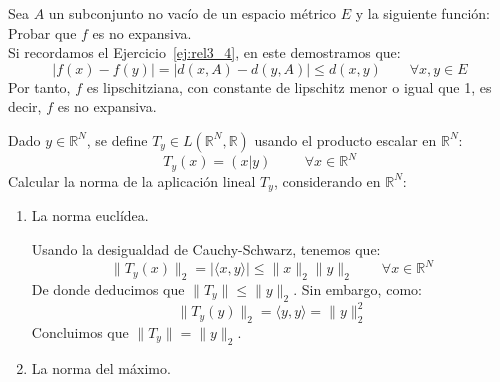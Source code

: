     \begin{ejercicio}
    Sea \( A \) un subconjunto no vacío de un espacio métrico \( E \) y la siguiente función:
    Probar que \( f \) es no expansiva.\\

    \noindent
    Si recordamos el Ejercicio~\ref{ej:rel3_4}, en este demostramos que:
    \begin{equation*}
        |f(x) - f(y)| = |d(x,A) - d(y,A)| \leq d(x,y) \qquad \forall x,y\in E
    \end{equation*}
    Por tanto, $f$ es lipschitziana, con constante de lipschitz menor o igual que 1, es decir, $f$ es no expansiva.
    \end{ejercicio}
    
    \begin{ejercicio}
    Dado \( y \in \mathbb{R}^N \), se define \( T_y \in L(\mathbb{R}^N, \mathbb{R}) \) usando el producto escalar en \( \mathbb{R}^N \):
    \[
    T_y(x) = \left( x | y \right) \hspace{1cm} \forall x \in \mathbb{R}^N 
    \]
    Calcular la norma de la aplicación lineal \( T_y \), considerando en \( \mathbb{R}^N \):
    \begin{enumerate}
        \item La norma euclídea.

            Usando la desigualdad de Cauchy-Schwarz, tenemos que:
            \begin{equation*}
                \|T_y(x)\|_2 = |\langle x,y \rangle| \leq \|x\|_2\|y\|_2 \qquad \forall x\in \mathbb{R}^N
            \end{equation*}
            De donde deducimos que $\|T_y\| \leq \|y\|_2$. Sin embargo, como:
            \begin{equation*}
                \|T_y(y)\|_2 = \langle y,y \rangle  = \|y\|_2^2
            \end{equation*}
            Concluimos que $\|T_y\| = \|y\|_2$.
        \item La norma del máximo.


\end{enumerate}
\end{ejercicio}
